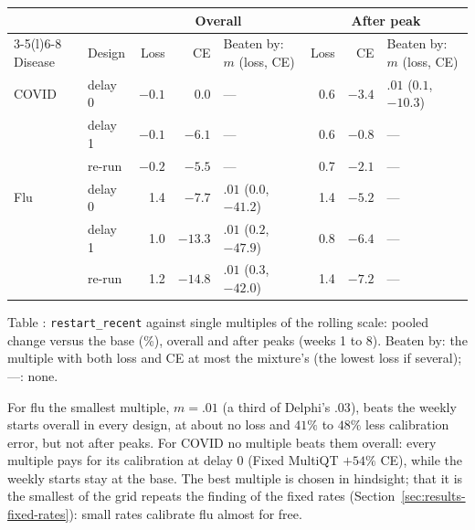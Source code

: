 \documentclass[11pt,a4paper]{article}
\theoremstyle{definition}
\theoremstyle{remark}
\begin{document}
\begin{center}\small
\setlength{\tabcolsep}{4.5pt}
\renewcommand{\arraystretch}{1.15}
\begin{tabular}{@{}llrrlrrl@{}}
\toprule
 & & \multicolumn{3}{c}{Overall} & \multicolumn{3}{c}{After peak}\\
\cmidrule(lr){3-5}\cmidrule(l){6-8}
Disease & Design & Loss & CE & Beaten by: $m$ (loss, CE) & Loss & CE & Beaten by: $m$ (loss, CE)\\
\midrule
COVID & delay 0 & $-0.1$ & 0.0     & ---                     & 0.6 & $-3.4$ & $.01$ ($0.1$, $-10.3$)\\
      & delay 1 & $-0.1$ & $-6.1$  & ---                     & 0.6 & $-0.8$ & ---\\
      & re-run  & $-0.2$ & $-5.5$  & ---                     & 0.7 & $-2.1$ & ---\\
\addlinespace
Flu   & delay 0 & 1.4    & $-7.7$  & $.01$ ($0.0$, $-41.2$)  & 1.4 & $-5.2$ & ---\\
      & delay 1 & 1.0    & $-13.3$ & $.01$ ($0.2$, $-47.9$)  & 0.8 & $-6.4$ & ---\\
      & re-run  & 1.2    & $-14.8$ & $.01$ ($0.3$, $-42.0$)  & 1.4 & $-7.2$ & ---\\
\bottomrule
\end{tabular}
\end{center}
\label{tab:mixture-vs-fixed}
\begin{center}\small Table \thetable: \texttt{restart\_recent} against
single multiples of the rolling scale: pooled change versus the base (\%),
overall and after peaks (weeks 1 to 8). Beaten by: the multiple with both
loss and CE at most the mixture's (the lowest loss if several); ---: none.
\end{center}

For flu the smallest multiple, $m=.01$ (a third of Delphi's $.03$), beats
the weekly starts overall in every design, at about no loss and $41\%$ to
$48\%$ less calibration error, but not after peaks. For COVID no multiple
beats them overall: every multiple pays for its calibration at delay 0
(Fixed MultiQT $+54\%$ CE), while the weekly starts stay at the base. The
best multiple is chosen in hindsight; that it is the smallest of the grid
repeats the finding of the fixed rates (Section~\ref{sec:results-fixed-rates}):
small rates calibrate flu almost for free.
\end{document}
